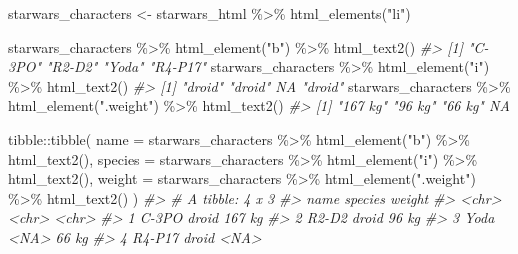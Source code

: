 \documentclass[
  12pt,
]{book}
\newenvironment{Shaded}{\begin{snugshade}}{\end{snugshade}}
\newcommand{\AttributeTok}[1]{\textcolor[rgb]{0.77,0.63,0.00}{#1}}
\newcommand{\CommentTok}[1]{\textcolor[rgb]{0.56,0.35,0.01}{\textit{#1}}}
\newcommand{\FunctionTok}[1]{\textcolor[rgb]{0.00,0.00,0.00}{#1}}
\newcommand{\NormalTok}[1]{#1}
\newcommand{\OtherTok}[1]{\textcolor[rgb]{0.56,0.35,0.01}{#1}}
\newcommand{\SpecialCharTok}[1]{\textcolor[rgb]{0.00,0.00,0.00}{#1}}
\newcommand{\StringTok}[1]{\textcolor[rgb]{0.31,0.60,0.02}{#1}}
\begin{document}
\begin{Shaded}
\begin{Highlighting}[]
\NormalTok{starwars\_characters }\OtherTok{\textless{}{-}}\NormalTok{ starwars\_html }\SpecialCharTok{\%\textgreater{}\%} \FunctionTok{html\_elements}\NormalTok{(}\StringTok{"li"}\NormalTok{)}

\NormalTok{starwars\_characters }\SpecialCharTok{\%\textgreater{}\%} \FunctionTok{html\_element}\NormalTok{(}\StringTok{"b"}\NormalTok{) }\SpecialCharTok{\%\textgreater{}\%} \FunctionTok{html\_text2}\NormalTok{()}
\CommentTok{\#\textgreater{} [1] "C{-}3PO"  "R2{-}D2"  "Yoda"   "R4{-}P17"}
\NormalTok{starwars\_characters }\SpecialCharTok{\%\textgreater{}\%} \FunctionTok{html\_element}\NormalTok{(}\StringTok{"i"}\NormalTok{) }\SpecialCharTok{\%\textgreater{}\%} \FunctionTok{html\_text2}\NormalTok{()}
\CommentTok{\#\textgreater{} [1] "droid" "droid" NA      "droid"}
\NormalTok{starwars\_characters }\SpecialCharTok{\%\textgreater{}\%} \FunctionTok{html\_element}\NormalTok{(}\StringTok{".weight"}\NormalTok{) }\SpecialCharTok{\%\textgreater{}\%} \FunctionTok{html\_text2}\NormalTok{()}
\CommentTok{\#\textgreater{} [1] "167 kg" "96 kg"  "66 kg"  NA}
\end{Highlighting}
\end{Shaded}

\begin{Shaded}
\begin{Highlighting}[]
\NormalTok{tibble}\SpecialCharTok{::}\FunctionTok{tibble}\NormalTok{(}
  \AttributeTok{name =}\NormalTok{ starwars\_characters }\SpecialCharTok{\%\textgreater{}\%} \FunctionTok{html\_element}\NormalTok{(}\StringTok{"b"}\NormalTok{) }\SpecialCharTok{\%\textgreater{}\%} \FunctionTok{html\_text2}\NormalTok{(),}
  \AttributeTok{species =}\NormalTok{ starwars\_characters }\SpecialCharTok{\%\textgreater{}\%} \FunctionTok{html\_element}\NormalTok{(}\StringTok{"i"}\NormalTok{) }\SpecialCharTok{\%\textgreater{}\%} \FunctionTok{html\_text2}\NormalTok{(),}
  \AttributeTok{weight =}\NormalTok{ starwars\_characters }\SpecialCharTok{\%\textgreater{}\%} \FunctionTok{html\_element}\NormalTok{(}\StringTok{".weight"}\NormalTok{) }\SpecialCharTok{\%\textgreater{}\%} \FunctionTok{html\_text2}\NormalTok{()}
\NormalTok{)}
\CommentTok{\#\textgreater{} \# A tibble: 4 x 3}
\CommentTok{\#\textgreater{}   name   species weight}
\CommentTok{\#\textgreater{}   \textless{}chr\textgreater{}  \textless{}chr\textgreater{}   \textless{}chr\textgreater{} }
\CommentTok{\#\textgreater{} 1 C{-}3PO  droid   167 kg}
\CommentTok{\#\textgreater{} 2 R2{-}D2  droid   96 kg }
\CommentTok{\#\textgreater{} 3 Yoda   \textless{}NA\textgreater{}    66 kg }
\CommentTok{\#\textgreater{} 4 R4{-}P17 droid   \textless{}NA\textgreater{}}
\end{Highlighting}
\end{Shaded}
\end{document}
